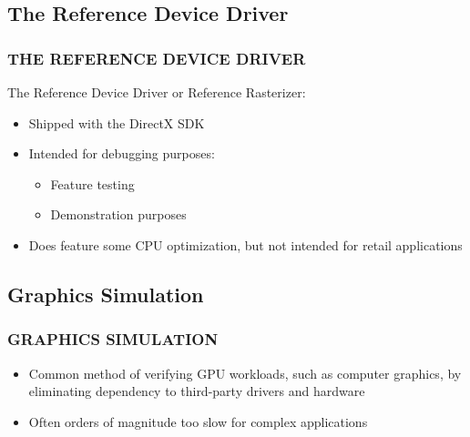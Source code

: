 \subsection{The Reference Device Driver}
\begin{frame}
\frametitle{THE REFERENCE DEVICE DRIVER}

The Reference Device Driver or Reference Rasterizer:
\begin{itemize}
\item Shipped with the DirectX SDK
\item Intended for debugging purposes:
  \begin{itemize}
  \item Feature testing
  \item Demonstration purposes
  \end{itemize}
\item Does feature some CPU optimization, but not intended for retail applications
\end{itemize}

\end{frame}

\subsection{Graphics Simulation}
\begin{frame}
\frametitle{GRAPHICS SIMULATION}

\begin{itemize}
\item Common method of verifying GPU workloads, such as computer graphics, by eliminating dependency to third-party drivers and hardware
\item Often orders of magnitude too slow for complex applications
\end{itemize}

\end{frame}

